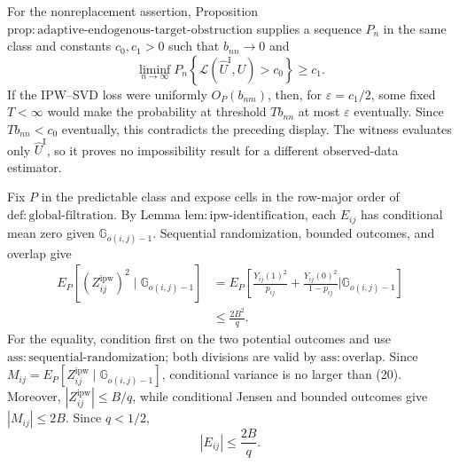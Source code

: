 For the nonreplacement assertion, Proposition \(\mathrm{prop:adaptive\mbox{-}endogenous\mbox{-}target\mbox{-}obstruction}\) supplies a sequence \(P_n\) in the same class and constants \(c_0,c_1>0\) such that \(b_{nn}\to0\) and
\[
 \liminf_{n\to\infty}P_n\!\left\{
 \mathcal L(\widehat U^{\mathrm I},U)>c_0\right\}\ge c_1.
\]
If the IPW--SVD loss were uniformly \(O_P(b_{nm})\), then, for \(\varepsilon=c_1/2\), some fixed \(T<\infty\) would make the probability at threshold \(Tb_{nn}\) at most \(\varepsilon\) eventually.  Since \(Tb_{nn}<c_0\) eventually, this contradicts the preceding display.  The witness evaluates only \(\widehat U^{\mathrm I}\), so it proves no impossibility result for a different observed-data estimator.

Fix \(P\) in the predictable class and expose cells in the row-major order of \(\mathrm{def:global\mbox{-}filtration}\).  By Lemma \(\mathrm{lem:ipw\mbox{-}identification}\), each \(E_{ij}\) has conditional mean zero given \(\mathbb G_{o(i,j)-1}\).  Sequential randomization, bounded outcomes, and overlap give
\[
 \begin{aligned}
 E_P\!\left[(Z^{\mathrm{ipw}}_{ij})^2
 \mid\mathbb G_{o(i,j)-1}\right]
 &=E_P\!\left[
 \frac{Y_{ij}(1)^2}{p_{ij}}+
 \frac{Y_{ij}(0)^2}{1-p_{ij}}
 \mathrel{\Big|}\mathbb G_{o(i,j)-1}\right]\\
 &\le \frac{2B^2}{q}.
 \end{aligned}
 \tag{20}
\]
For the equality, condition first on the two potential outcomes and use \(\mathrm{ass:sequential\mbox{-}randomization}\); both divisions are valid by \(\mathrm{ass:overlap}\).  Since \(M_{ij}=E_P[Z^{\mathrm{ipw}}_{ij}\mid\mathbb G_{o(i,j)-1}]\), conditional variance is no larger than (20).  Moreover, \(|Z^{\mathrm{ipw}}_{ij}|\le B/q\), while conditional Jensen and bounded outcomes give \(|M_{ij}|\le2B\).  Since \(q<1/2\),
\[
 |E_{ij}|\le \frac{2B}{q}.
 \tag{21}
\]

